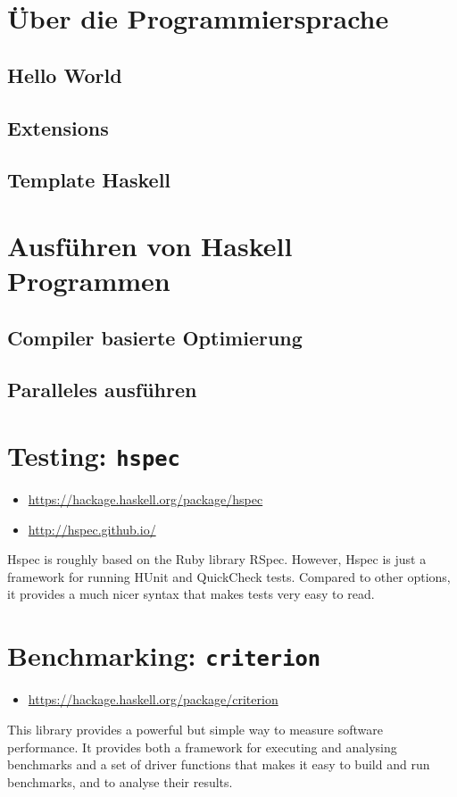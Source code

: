 \section{Über die Programmiersprache}

\subsection{Hello World}

\subsection{Extensions}
\subsection{Template Haskell}

\section{Ausführen von Haskell Programmen}

\subsection{Compiler basierte Optimierung}

\subsection{Paralleles ausführen}

\section{Testing: \texttt{hspec}}
\begin{itemize}
  \item \url{https://hackage.haskell.org/package/hspec}
  \item \url{http://hspec.github.io/}
\end{itemize}
Hspec is roughly based on the Ruby library RSpec. However, Hspec is just a
framework for running HUnit and QuickCheck tests. Compared to other options, it
provides a much nicer syntax that makes tests very easy to read.

\section{Benchmarking: \texttt{criterion}}
\begin{itemize}
  \item \url{https://hackage.haskell.org/package/criterion}
\end{itemize}
This library provides a powerful but simple way to measure software
performance. It provides both a framework for executing and analysing
benchmarks and a set of driver functions that makes it easy to build and run
benchmarks, and to analyse their results.

